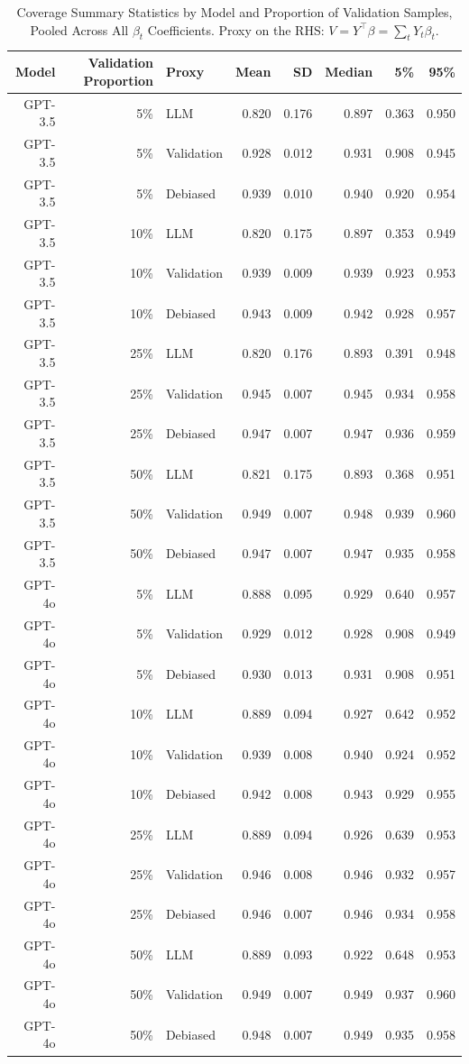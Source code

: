 \begin{table}

\caption{Coverage Summary Statistics by Model and Proportion of Validation Samples, Pooled Across All $\beta_{t}$ Coefficients. Proxy on the RHS: $V = Y^\top \beta = \sum_{t} Y_t \beta_t$.}
\centering
\begin{tabular}[t]{rrlrrrrr}
\toprule
Model & Validation Proportion & Proxy & Mean & SD & Median & 5\% & 95\%\\
\midrule
GPT-3.5 & 5\% & LLM & 0.820 & 0.176 & 0.897 & 0.363 & 0.950\\
GPT-3.5 & 5\% & Validation & 0.928 & 0.012 & 0.931 & 0.908 & 0.945\\
GPT-3.5 & 5\% & Debiased & 0.939 & 0.010 & 0.940 & 0.920 & 0.954\\
GPT-3.5 & 10\% & LLM & 0.820 & 0.175 & 0.897 & 0.353 & 0.949\\
GPT-3.5 & 10\% & Validation & 0.939 & 0.009 & 0.939 & 0.923 & 0.953\\
GPT-3.5 & 10\% & Debiased & 0.943 & 0.009 & 0.942 & 0.928 & 0.957\\
GPT-3.5 & 25\% & LLM & 0.820 & 0.176 & 0.893 & 0.391 & 0.948\\
GPT-3.5 & 25\% & Validation & 0.945 & 0.007 & 0.945 & 0.934 & 0.958\\
GPT-3.5 & 25\% & Debiased & 0.947 & 0.007 & 0.947 & 0.936 & 0.959\\
GPT-3.5 & 50\% & LLM & 0.821 & 0.175 & 0.893 & 0.368 & 0.951\\
GPT-3.5 & 50\% & Validation & 0.949 & 0.007 & 0.948 & 0.939 & 0.960\\
GPT-3.5 & 50\% & Debiased & 0.947 & 0.007 & 0.947 & 0.935 & 0.958\\
GPT-4o & 5\% & LLM & 0.888 & 0.095 & 0.929 & 0.640 & 0.957\\
GPT-4o & 5\% & Validation & 0.929 & 0.012 & 0.928 & 0.908 & 0.949\\
GPT-4o & 5\% & Debiased & 0.930 & 0.013 & 0.931 & 0.908 & 0.951\\
GPT-4o & 10\% & LLM & 0.889 & 0.094 & 0.927 & 0.642 & 0.952\\
GPT-4o & 10\% & Validation & 0.939 & 0.008 & 0.940 & 0.924 & 0.952\\
GPT-4o & 10\% & Debiased & 0.942 & 0.008 & 0.943 & 0.929 & 0.955\\
GPT-4o & 25\% & LLM & 0.889 & 0.094 & 0.926 & 0.639 & 0.953\\
GPT-4o & 25\% & Validation & 0.946 & 0.008 & 0.946 & 0.932 & 0.957\\
GPT-4o & 25\% & Debiased & 0.946 & 0.007 & 0.946 & 0.934 & 0.958\\
GPT-4o & 50\% & LLM & 0.889 & 0.093 & 0.922 & 0.648 & 0.953\\
GPT-4o & 50\% & Validation & 0.949 & 0.007 & 0.949 & 0.937 & 0.960\\
GPT-4o & 50\% & Debiased & 0.948 & 0.007 & 0.949 & 0.935 & 0.958\\
\bottomrule
\end{tabular}
\end{table}
